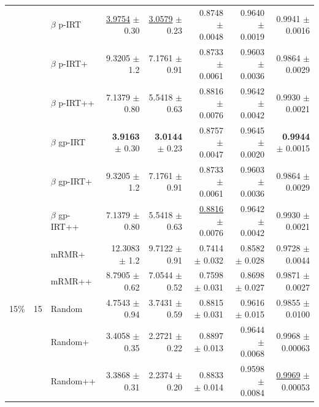 \begin{longtable}{llp{}rrrrr}
 &  & $\beta$ p-IRT & \underline{3.9754} {\scriptsize $\pm$ 0.30} & \underline{3.0579} {\scriptsize $\pm$ 0.23} & 0.8748 {\scriptsize $\pm$ 0.0048} & 0.9640 {\scriptsize $\pm$ 0.0019} & 0.9941 {\scriptsize $\pm$ 0.0016} \\
 &  & $\beta$ p-IRT+ & 9.3205 {\scriptsize $\pm$ 1.2} & 7.1761 {\scriptsize $\pm$ 0.91} & 0.8733 {\scriptsize $\pm$ 0.0061} & 0.9603 {\scriptsize $\pm$ 0.0036} & 0.9864 {\scriptsize $\pm$ 0.0029} \\
 &  & $\beta$ p-IRT++ & 7.1379 {\scriptsize $\pm$ 0.80} & 5.5418 {\scriptsize $\pm$ 0.63} & 0.8816 {\scriptsize $\pm$ 0.0076} & 0.9642 {\scriptsize $\pm$ 0.0042} & 0.9930 {\scriptsize $\pm$ 0.0021} \\
 &  & $\beta$ gp-IRT & \textbf{3.9163} {\scriptsize $\pm$ 0.30} & \textbf{3.0144} {\scriptsize $\pm$ 0.23} & 0.8757 {\scriptsize $\pm$ 0.0047} & 0.9645 {\scriptsize $\pm$ 0.0020} & \textbf{0.9944} {\scriptsize $\pm$ 0.0015} \\
 &  & $\beta$ gp-IRT+ & 9.3205 {\scriptsize $\pm$ 1.2} & 7.1761 {\scriptsize $\pm$ 0.91} & 0.8733 {\scriptsize $\pm$ 0.0061} & 0.9603 {\scriptsize $\pm$ 0.0036} & 0.9864 {\scriptsize $\pm$ 0.0029} \\
 &  & $\beta$ gp-IRT++ & 7.1379 {\scriptsize $\pm$ 0.80} & 5.5418 {\scriptsize $\pm$ 0.63} & \underline{0.8816} {\scriptsize $\pm$ 0.0076} & 0.9642 {\scriptsize $\pm$ 0.0042} & 0.9930 {\scriptsize $\pm$ 0.0021} \\
 &  & mRMR+ & 12.3083 {\scriptsize $\pm$ 1.2} & 9.7122 {\scriptsize $\pm$ 0.91} & 0.7414 {\scriptsize $\pm$ 0.032} & 0.8582 {\scriptsize $\pm$ 0.028} & 0.9728 {\scriptsize $\pm$ 0.0044} \\
 &  & mRMR++ & 8.7905 {\scriptsize $\pm$ 0.62} & 7.0544 {\scriptsize $\pm$ 0.52} & 0.7598 {\scriptsize $\pm$ 0.031} & 0.8698 {\scriptsize $\pm$ 0.027} & 0.9871 {\scriptsize $\pm$ 0.0027} \\
\midrule
15\% & 15 & Random & 4.7543 {\scriptsize $\pm$ 0.94} & 3.7431 {\scriptsize $\pm$ 0.59} & 0.8815 {\scriptsize $\pm$ 0.031} & 0.9616 {\scriptsize $\pm$ 0.015} & 0.9855 {\scriptsize $\pm$ 0.0100} \\
 &  & Random+ & 3.4058 {\scriptsize $\pm$ 0.35} & 2.2721 {\scriptsize $\pm$ 0.22} & 0.8897 {\scriptsize $\pm$ 0.013} & 0.9644 {\scriptsize $\pm$ 0.0068} & 0.9968 {\scriptsize $\pm$ 0.00063} \\
 &  & Random++ & 3.3868 {\scriptsize $\pm$ 0.31} & 2.2374 {\scriptsize $\pm$ 0.20} & 0.8833 {\scriptsize $\pm$ 0.014} & 0.9598 {\scriptsize $\pm$ 0.0084} & \underline{0.9969} {\scriptsize $\pm$ 0.00053} \\

\end{longtable}
